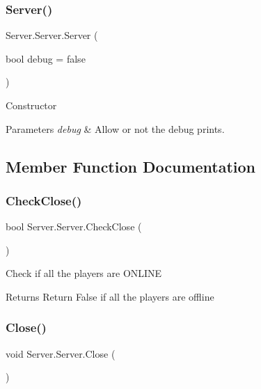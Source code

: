 \subsubsection{\texorpdfstring{Server()}{Server()}}
{\footnotesize\ttfamily Server.\+Server.\+Server (\begin{DoxyParamCaption}\item[{bool}]{debug = {\ttfamily false} }\end{DoxyParamCaption})\hspace{0.3cm}{\ttfamily [inline]}}

Constructor 
\begin{DoxyParams}{Parameters}
{\em debug} & Allow or not the debug prints. \\
\hline
\end{DoxyParams}


\subsection{Member Function Documentation}
\mbox{\label{class_server_1_1_server_a9944a0c7ee91e196b9eefdf723b08ae4}} 
\subsubsection{\texorpdfstring{Check\+Close()}{CheckClose()}}
{\footnotesize\ttfamily bool Server.\+Server.\+Check\+Close (\begin{DoxyParamCaption}{ }\end{DoxyParamCaption})\hspace{0.3cm}{\ttfamily [inline]}}

Check if all the players are O\+N\+L\+I\+NE \begin{DoxyReturn}{Returns}
Return False if all the players are offline 
\end{DoxyReturn}
\mbox{\label{class_server_1_1_server_af043e9887ea794762dd17f3ed2cb2580}} 
\subsubsection{\texorpdfstring{Close()}{Close()}}
{\footnotesize\ttfamily void Server.\+Server.\+Close (\begin{DoxyParamCaption}{ }\end{DoxyParamCaption})\hspace{0.3cm}{\ttfamily [inline]}}


